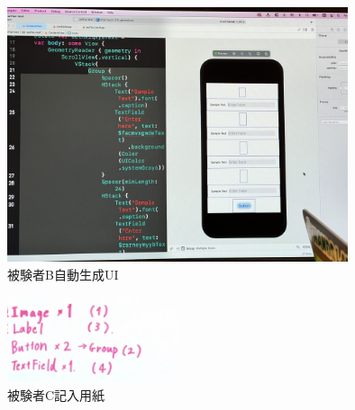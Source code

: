 \begin{figure}[htbp]
  \begin{minipage}{\hsize}
    \begin{center}
       \includegraphics[width=100mm]{img/usertest_autogen_2.jpeg}
    \end{center}
    \caption{被験者B自動生成UI}
    \label{fig:usertest_autogen_2}
  \end{minipage}
\end{figure}


\begin{figure}[htbp]
  \begin{minipage}{\hsize}
    \begin{center}
       \includegraphics[width=50mm]{img/usertest_viewstructure_3.png}
    \end{center}
    \caption{被験者C記入用紙}
    \label{fig:usertest_viewstructure_3}
  \end{minipage}
\end{figure}



